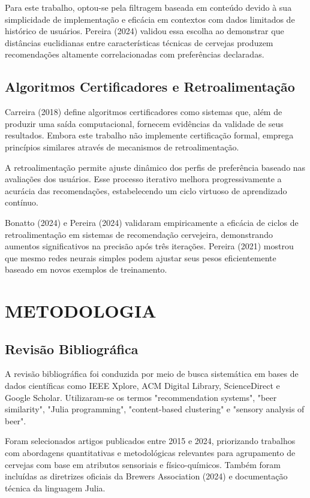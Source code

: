 \documentclass[12pt,a4paper]{article}
\begin{document}
Para este trabalho, optou-se pela filtragem baseada em conteúdo devido à sua simplicidade de implementação e eficácia em contextos com dados limitados de histórico de usuários. Pereira (2024) validou essa escolha ao demonstrar que distâncias euclidianas entre características técnicas de cervejas produzem recomendações altamente correlacionadas com preferências declaradas.

\subsection{Algoritmos Certificadores e Retroalimentação}

Carreira (2018) define algoritmos certificadores como sistemas que, além de produzir uma saída computacional, fornecem evidências da validade de seus resultados. Embora este trabalho não implemente certificação formal, emprega princípios similares através de mecanismos de retroalimentação.

A retroalimentação permite ajuste dinâmico dos perfis de preferência baseado nas avaliações dos usuários. Esse processo iterativo melhora progressivamente a acurácia das recomendações, estabelecendo um ciclo virtuoso de aprendizado contínuo.

Bonatto (2024) e Pereira (2024) validaram empiricamente a eficácia de ciclos de retroalimentação em sistemas de recomendação cervejeira, demonstrando aumentos significativos na precisão após três iterações. Pereira (2021) mostrou que mesmo redes neurais simples podem ajustar seus pesos eficientemente baseado em novos exemplos de treinamento.

\newpage
\section{METODOLOGIA}

\subsection{Revis\~ao Bibliogr\'afica}

A revis\~ao bibliogr\'afica foi conduzida por meio de busca sistem\'atica em bases de dados cient\'ificas como IEEE Xplore, ACM Digital Library, ScienceDirect e Google Scholar. Utilizaram-se os termos "recommendation systems", "beer similarity", "Julia programming", "content-based clustering" e "sensory analysis of beer".

Foram selecionados artigos publicados entre 2015 e 2024, priorizando trabalhos com abordagens quantitativas e metodol\'ogicas relevantes para agrupamento de cervejas com base em atributos sensoriais e f\'isico-qu\'imicos. Tamb\'em foram inclu\'idas as diretrizes oficiais da Brewers Association (2024) e documenta\c{c}\~ao t\'ecnica da linguagem Julia.
\end{document}
